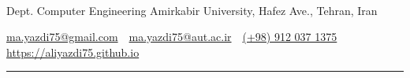 \documentclass[letterpaper,MMMyyyy,nonstopmode]{resume}
\newcommand{\CVAuthor}{Ali Yazdi}
\newcommand{\CVWebpage}{https://aliyazdi75.github.io}
\begin{document}

\Title{\CVAuthor}

\begin{SubTitle}
\normalsize{
\href{https://www.linkedin.com/in/aliyazdi75}
{\faLinkedin}
\,\SubBulletSymbol\,
\href{https://github.com/aliyazdi75}
{\faGithub}
\,\SubBulletSymbol\,
\href{https://twitter.com/aliyazdi75}
{\faTwitter}
\,\SubBulletSymbol\,
\href{https://join.skype.com/invite/h3jUqpJH9jLh}
{\faSkype}
\,\SubBulletSymbol\,
\href{https://t.me/aliyazdi75}
{\faTelegram}
\,\SubBulletSymbol\,
\href{mailto:ma.yazdi75@gmail.com}
{\faEnvelope}
\,\SubBulletSymbol\,
\href{tel:+989120371375}
{\faPhone}
\,\SubBulletSymbol\,
\href{\CVWebpage}
{\faGlobe}
}
\par
Dept. Computer Engineering Amirkabir University, Hafez Ave., Tehran, Iran
\par
\href{mailto:ma.yazdi75@gmail.com}
{ma.yazdi75@gmail.com}
\,\SubBulletSymbol\,
\href{mailto:ma.yazdi75@aut.ac.ir}
{ma.yazdi75@aut.ac.ir}
\,\SubBulletSymbol\,
\href{tel:+989120371375}
{(+98) 912 037 1375}
\,\SubBulletSymbol\,
\href{\CVWebpage}
{\CVWebpage}
\end{SubTitle}

\smallskip\hrule
\end{document}

